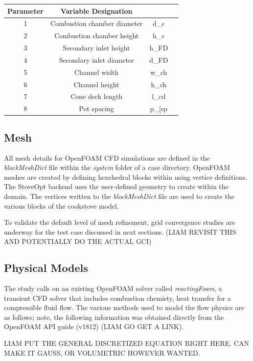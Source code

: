 \documentclass[3p,times,twocolumn]{elsarticle}
\begin{document}
\begin{table}[h!]
	\centering
	 \begin{tabular}{||c c c c||} 
		  \hline
		   Parameter & Variable Designation \\ [0.5ex] 
		    \hline\hline
		     1 & Combustion chamber diameter & d_{c} \\ 
		      2 & Combustion chamber height & h_{c} \\
		       3 & Secondary inlet height & h_{FD} \\
			4 & Secondary inlet diameter & d_{FD} \\
			 5 & Channel width & w_{ch} \\ [1ex] 
			  6 & Channel height & h_{ch} \\ [1ex]
			   7 & Cone deck length & l_{cd} \\ [1ex]
			    8 & Pot spacing & p_[sp} \\ [1ex]
			  \hline
			   \end{tabular}
\end{table}

\subsection{Mesh}
All mesh details for OpenFOAM CFD simulations are defined in the \textit{blockMeshDict} file within the \textit{system} folder of a case directory. OpenFOAM meshes are created by defining hexehedral blocks within using vertice definitions. The StoveOpt backend uses the user-defined geometry to create within the domain. The vertices written to the \textit{blockMeshDict} file are used to create the various blocks of the cookstove model.

To validate the default level of mesh refinement, grid convergence studies are underway for the test case discussed in next sections.   (LIAM REVISIT THIS AND POTENTIALLY DO THE ACTUAL GCI)

\subsection{Physical Models}
The study calls on an existing OpenFOAM solver called \textit{reactingFoam}, a transient CFD solver that includes combustion chemisty, heat transfer for a compressible fluid flow. The various methods used to model the flow physics are as follows; note, the following information was obtained directly from the OpenFOAM API guide (v1812) (LIAM GO GET A LINK).

LIAM PUT THE GENERAL DISCRETIZED EQUATION RIGHT HERE. CAN MAKE IT GAUSS, OR VOLUMETRIC HOWEVER WANTED.
\end{document}
